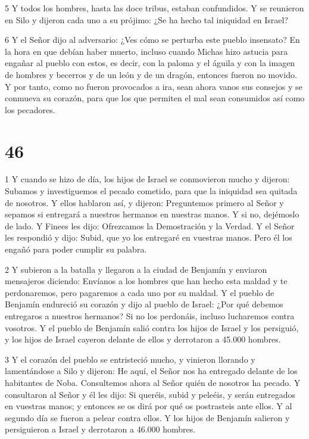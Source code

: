 \par 5 Y todos los hombres, hasta las doce tribus, estaban confundidos. Y se reunieron en Silo y dijeron cada uno a su prójimo: ¿Se ha hecho tal iniquidad en Israel?

\par 6 Y el Señor dijo al adversario: ¿Ves cómo se perturba este pueblo insensato? En la hora en que debían haber muerto, incluso cuando Michas hizo astucia para engañar al pueblo con estos, es decir, con la paloma y el águila y con la imagen de hombres y becerros y de un león y de un dragón, entonces fueron no movido. Y por tanto, como no fueron provocados a ira, sean ahora vanos sus consejos y se conmueva su corazón, para que los que permiten el mal sean consumidos así como los pecadores.

\chapter{46}

\par 1 Y cuando se hizo de día, los hijos de Israel se conmovieron mucho y dijeron: Subamos y investiguemos el pecado cometido, para que la iniquidad sea quitada de nosotros. Y ellos hablaron así, y dijeron: Preguntemos primero al Señor y sepamos si entregará a nuestros hermanos en nuestras manos. Y si no, dejémoslo de lado. Y Finees les dijo: Ofrezcamos la Demostración y la Verdad. Y el Señor les respondió y dijo: Subid, que yo los entregaré en vuestras manos. Pero él los engañó para poder cumplir su palabra.

\par 2 Y subieron a la batalla y llegaron a la ciudad de Benjamín y enviaron mensajeros diciendo: Envíanos a los hombres que han hecho esta maldad y te perdonaremos, pero pagaremos a cada uno por su maldad. Y el pueblo de Benjamín endureció su corazón y dijo al pueblo de Israel: ¿Por qué debemos entregaros a nuestros hermanos? Si no los perdonáis, incluso lucharemos contra vosotros. Y el pueblo de Benjamín salió contra los hijos de Israel y los persiguió, y los hijos de Israel cayeron delante de ellos y derrotaron a 45.000 hombres.

\par 3 Y el corazón del pueblo se entristeció mucho, y vinieron llorando y lamentándose a Silo y dijeron: He aquí, el Señor nos ha entregado delante de los habitantes de Noba. Consultemos ahora al Señor quién de nosotros ha pecado. Y consultaron al Señor y él les dijo: Si queréis, subid y peleéis, y serán entregados en vuestras manos; y entonces se os dirá por qué os postrasteis ante ellos. Y al segundo día se fueron a pelear contra ellos. Y los hijos de Benjamín salieron y persiguieron a Israel y derrotaron a 46.000 hombres.

